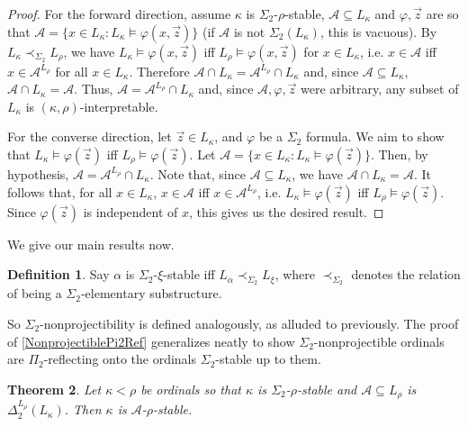 \documentclass{article}
\theoremstyle{definition}
\newtheorem{definition}{Definition}[section]
\theoremstyle{plain}
\newtheorem{theorem}[definition]{Theorem}
\theoremstyle{plain}
\theoremstyle{plain}
\theoremstyle{plain}
\theoremstyle{remark}
\theoremstyle{remark}
\theoremstyle{remark}
\theoremstyle{plain}
\theoremstyle{plain}
\theoremstyle{plain}
\begin{document}
\begin{proof}
For the forward direction, assume $\kappa$ is $\Sigma_2$-$\rho$-stable, $\mathcal{A} \subseteq L_\kappa$ and $\varphi, \vec{z}$ are so that $\mathcal{A} = \{x \in L_\kappa: L_\kappa \models \varphi(x, \vec{z})\}$ (if $\mathcal{A}$ is not $\Sigma_2(L_\kappa)$, this is vacuous). By $L_\kappa \prec_{\Sigma_2} L_\rho$, we have $L_\kappa \models \varphi(x, \vec{z})$ iff $L_\rho \models \varphi(x, \vec{z})$ for $x \in L_\kappa$, i.e. $x \in \mathcal{A}$ iff $x \in \mathcal{A}^{L_\rho}$ for all $x \in L_\kappa$. Therefore $\mathcal{A} \cap L_\kappa = \mathcal{A}^{L_\rho} \cap L_\kappa$ and, since $\mathcal{A} \subseteq L_\kappa$, $\mathcal{A} \cap L_\kappa = \mathcal{A}$. Thus, $\mathcal{A} = \mathcal{A}^{L_\rho} \cap L_\kappa$ and, since $\mathcal{A}, \varphi, \vec{z}$ were arbitrary, any subset of $L_\kappa$ is $(\kappa, \rho)$-interpretable.

For the converse direction, let $\vec{z} \in L_\kappa$, and $\varphi$ be a $\Sigma_2$ formula. We aim to show that $L_\kappa \models \varphi(\vec{z})$ iff $L_\rho \models \varphi(\vec{z})$. Let $\mathcal{A} = \{x \in L_\kappa: L_\kappa \models \varphi(\vec{z})\}$. Then, by hypothesis, $\mathcal{A} = \mathcal{A}^{L_\rho} \cap L_\kappa$. Note that, since $\mathcal{A} \subseteq L_\kappa$, we have $\mathcal{A} \cap L_\kappa = \mathcal{A}$. It follows that, for all $x \in L_\kappa$, $x \in \mathcal{A}$ iff $x \in \mathcal{A}^{L_\rho}$, i.e. $L_\kappa \models \varphi(\vec{z})$ iff $L_\rho \models \varphi(\vec{z})$. Since $\varphi(\vec{z})$ is independent of $x$, this gives us the desired result.
\end{proof}

We give our main results now.

\begin{definition}
\label{Sigma2Stability}
Say $\alpha$ is $\Sigma_2$-$\xi$-stable iff $L_\alpha \prec_{\Sigma_2} L_\xi$, where $\prec_{\Sigma_2}$ denotes the relation of being a $\Sigma_2$-elementary substructure.
\end{definition}

So $\Sigma_2$-nonprojectibility is defined analogously, as alluded to previously. The proof of \ref{NonprojectiblePi2Ref} generalizes neatly to show $\Sigma_2$-nonprojectible ordinals are $\Pi_2$-reflecting onto the ordinals $\Sigma_2$-stable up to them.

\begin{theorem}
\label{PredicateElimination}
Let $\kappa < \rho$ be ordinals so that $\kappa$ is $\Sigma_2$-$\rho$-stable and $\mathcal{A} \subseteq L_\rho$ is $\Delta_2^{L_\rho}(L_\kappa)$. Then $\kappa$ is $\mathcal{A}$-$\rho$-stable.
\end{theorem}
\end{document}

